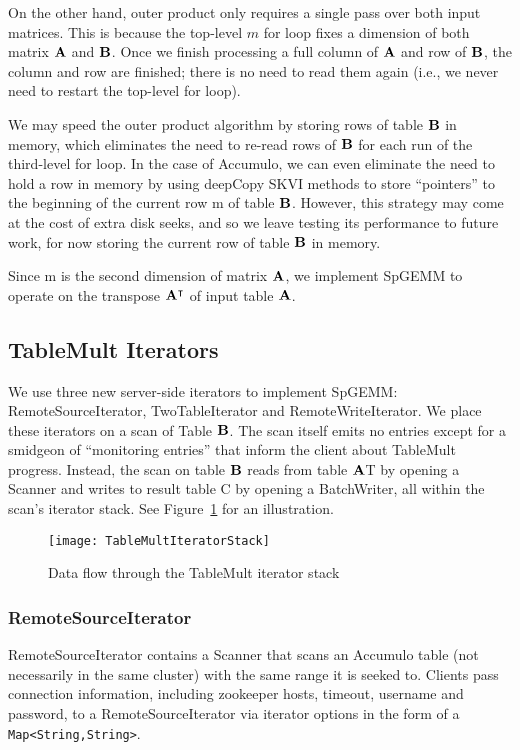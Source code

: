 On the other hand, outer product only requires a single pass over both input matrices.
This is because the top-level $m$ for loop fixes a dimension of both matrix $\mathbf{A}$ and $\mathbf{B}$.
Once we finish processing a full column of $\mathbf{A}$ and row of $\mathbf{B}$, the column and row are finished;
there is no need to read them again (i.e., we never need to restart the top-level for loop).

We may speed the outer product algorithm by storing rows of table $\mathbf{B}$ in memory,
which eliminates the need to re-read rows of $\mathbf{B}$ for each run of the third-level for loop.
In the case of Accumulo, we can even eliminate the need to hold a row in memory by using
deepCopy SKVI methods to store ``pointers'' to the beginning of the current row m of table $\mathbf{B}$.
However, this strategy may come at the cost of extra disk seeks, and so
we leave testing its performance to future work, for now storing the current row of table $\mathbf{B}$ in memory.

Since m is the second dimension of matrix $\mathbf{A}$, we implement 
SpGEMM to operate on the transpose $\mathbf{A^{\intercal}}$ of input table $\mathbf{A}$.



\subsection{TableMult Iterators}
We use three new server-side iterators to implement SpGEMM: 
RemoteSourceIterator, TwoTableIterator and RemoteWriteIterator.
We place these iterators on a scan of Table $\mathbf{B}$. The scan itself emits no 
entries except for a smidgeon of ``monitoring entries'' that inform the client 
about TableMult progress. Instead, the scan on table $\mathbf{B}$ reads from table $\mathbf{A}$T
by opening a Scanner and writes to result table C
by opening a BatchWriter, all within the scan's iterator stack.
See Figure~\ref{fIteratorStackSpGEMM} for an illustration.

\begin{figure}[htb]
\centering
\texttt{[image: TableMultIteratorStack]}
\caption{Data flow through the TableMult iterator stack}
\label{fIteratorStackSpGEMM}
\end{figure}

\subsubsection{RemoteSourceIterator}
RemoteSourceIterator contains a Scanner that scans an Accumulo table
(not necessarily in the same cluster) with the same range it is seeked to.
Clients pass connection information, including zookeeper hosts, timeout,
username and password, to a RemoteSourceIterator via iterator options
in the form of a \texttt{Map<String,String>}.

